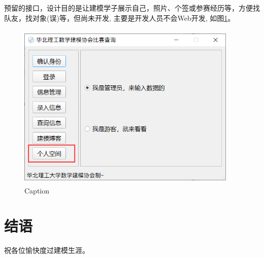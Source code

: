 \documentclass[cn,11pt,chinese, hazy]{elegantbook}
\begin{document}
预留的接口，设计目的是让建模学子展示自己，照片、个签或参赛经历等，方便找队友，找对象(误)等，但尚未开发,
主要是开发人员不会Web开发, 如图\ref{fig:space}。

\begin{figure}[h]
    \centering
    \includegraphics[width=10.5cm, height=8cm]{figure/11.png}
    \caption{Caption}
    \label{fig:space}
\end{figure}

\chapter{结语}

祝各位愉快度过建模生涯。
\end{document}
